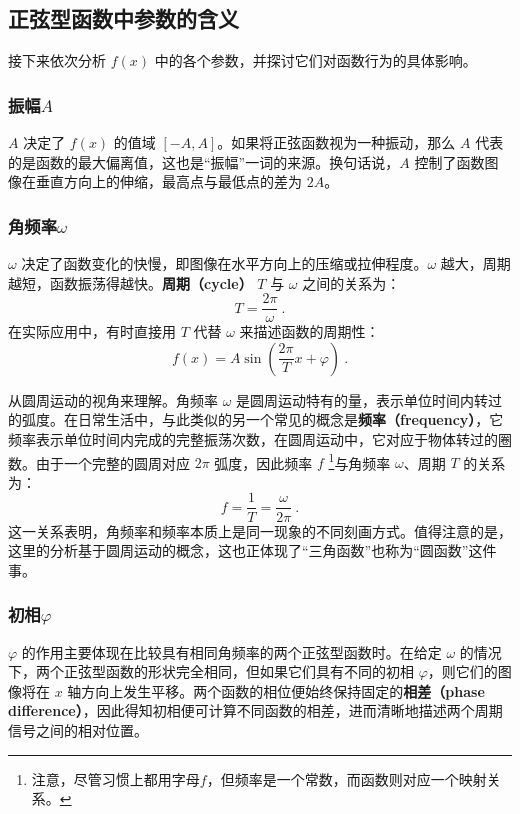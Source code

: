\subsection{正弦型函数中参数的含义}

接下来依次分析 $f(x)$ 中的各个参数，并探讨它们对函数行为的具体影响。

\subsubsection{振幅$A$}

$A$ 决定了 $f(x)$ 的值域 $\left[-A, A\right]$。如果将正弦函数视为一种振动，那么 $A$ 代表的是函数的最大偏离值，这也是“振幅”一词的来源。换句话说，$A$ 控制了函数图像在垂直方向上的伸缩，最高点与最低点的差为 $2A$。
\subsubsection{角频率$\omega$}
$\omega$ 决定了函数变化的快慢，即图像在水平方向上的压缩或拉伸程度。$\omega$ 越大，周期越短，函数振荡得越快。\textbf{周期（cycle）} $T$ 与 $\omega$ 之间的关系为：
\begin{equation}
    T = \frac{2\pi}{\omega}~.
\end{equation}
在实际应用中，有时直接用 $T$ 代替 $\omega$ 来描述函数的周期性：
\begin{equation}
    f(x) = A\sin\left(\frac{2\pi}{T} x + \varphi\right)~.
\end{equation}

从圆周运动的视角来理解。角频率 $\omega$ 是圆周运动特有的量，表示单位时间内转过的弧度。在日常生活中，与此类似的另一个常见的概念是\textbf{频率（frequency）}，它频率表示单位时间内完成的完整振荡次数，在圆周运动中，它对应于物体转过的圈数。由于一个完整的圆周对应 $2\pi$ 弧度，因此频率 $f$ \footnote{注意，尽管习惯上都用字母$f$，但频率是一个常数，而函数则对应一个映射关系。}与角频率 $\omega$、周期 $T$ 的关系为：
\begin{equation}
    f = \frac{1}{T} = \frac{\omega}{2\pi}~.
\end{equation}
这一关系表明，角频率和频率本质上是同一现象的不同刻画方式。值得注意的是，这里的分析基于圆周运动的概念，这也正体现了“三角函数”也称为“圆函数”这件事。

\subsubsection{初相$\varphi$}

$\varphi$ 的作用主要体现在比较具有相同角频率的两个正弦型函数时。在给定 $\omega$ 的情况下，两个正弦型函数的形状完全相同，但如果它们具有不同的初相 $\varphi$，则它们的图像将在 $x$ 轴方向上发生平移。两个函数的相位便始终保持固定的\textbf{相差（phase difference）}，因此得知初相便可计算不同函数的相差，进而清晰地描述两个周期信号之间的相对位置。


